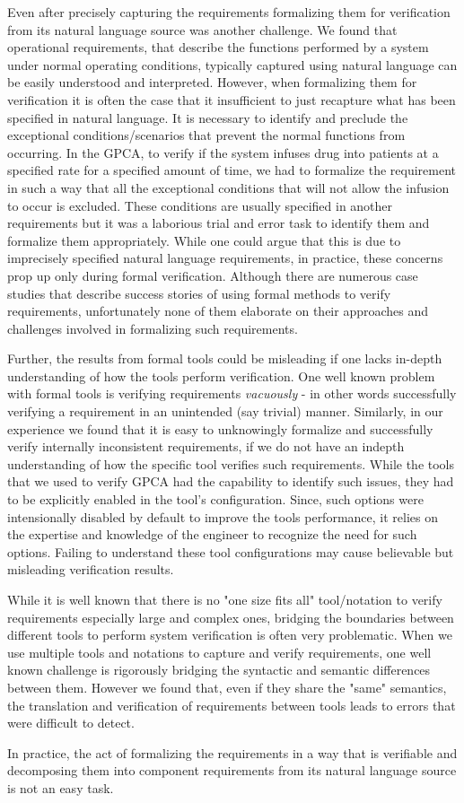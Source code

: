 Even after precisely capturing the requirements formalizing them for verification from its natural language source was another challenge. We found that operational requirements, that describe the functions performed by a system under normal operating conditions, typically captured using natural language can be easily understood and interpreted. However, when formalizing them for verification it is often the case that it insufficient to just recapture what has been specified in natural language. It is necessary to identify and preclude the exceptional conditions/scenarios that prevent the normal functions from occurring. In the GPCA, to verify if the system infuses drug into patients at a specified rate for a specified amount of time, we had to formalize the requirement in such a way that all the exceptional conditions that will not allow the infusion to occur is excluded. These conditions are usually specified in another requirements but it was a laborious trial and error task to identify them and formalize them appropriately. While one could argue that this is due to imprecisely specified natural language requirements, in practice, these concerns prop up only during formal verification. Although there are numerous case studies that describe success stories of using formal methods to verify requirements, unfortunately none of them elaborate on their approaches and challenges involved in formalizing such requirements.

Further, the results from formal tools could be misleading if one lacks in-depth understanding of how the tools perform verification. One well known problem with formal tools is verifying requirements \emph{vacuously} - in other words successfully verifying a requirement in an unintended (say trivial) manner. Similarly, in our experience we found that it is easy to unknowingly formalize and successfully verify internally inconsistent requirements, if we do not have an indepth understanding of how the specific tool verifies such requirements. While the tools that we used to verify GPCA had the capability to identify such issues, they had to be explicitly enabled in the tool's configuration. Since, such options were intensionally disabled by default to improve the tools performance, it relies on the expertise and knowledge of the engineer to recognize the need for such options. Failing to understand these tool configurations may cause believable but misleading verification results.

While it is well known that there is no "one size fits all" tool/notation to verify requirements especially large and complex ones, bridging the boundaries between different tools to perform system verification is often very problematic. When we use multiple tools and notations to capture and verify requirements, one well known challenge is rigorously bridging the syntactic and semantic differences between them. However we found that, even if they share the "same" semantics, the translation and verification of requirements between tools leads to errors that were difficult to detect.

In practice, the act of formalizing the requirements in a way that is verifiable and decomposing them into component requirements from its natural language source is not an easy task.

\fi
